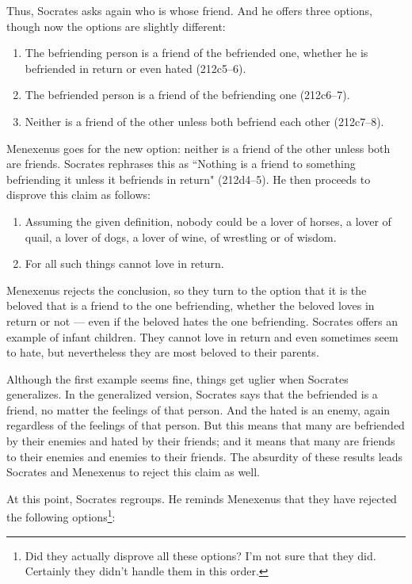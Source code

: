 \documentclass[11pt]{article}
\begin{document}
Thus, Socrates asks again who is whose friend. And he offers three options, though now the options are slightly different:

\begin{enumerate}
    \item The befriending person is a friend of the befriended one, whether he is befriended in return or even hated (212c5--6).
    \item The befriended person is a friend of the befriending one (212c6--7).
    \item Neither is a friend of the other unless both befriend each other (212c7--8).
\end{enumerate}

Menexenus goes for the new option: neither is a friend of the other unless both are friends.  Socrates rephrases this as ``Nothing is a friend to something befriending it unless it befriends in return" (212d4--5).  He then proceeds to disprove this claim as follows:

\begin{enumerate}
    \item Assuming the given definition, nobody could be a lover of horses, a lover of quail, a lover of dogs, a lover of wine, of wrestling or of wisdom.
    \item For all such things cannot love in return.
\end{enumerate}

Menexenus rejects the conclusion, so they turn to the option that it is the beloved that is a friend to the one befriending, whether the beloved loves in return or not --- even if the beloved hates the one befriending.  Socrates offers an example of infant children.  They cannot love in return and even sometimes seem to hate, but nevertheless they are most beloved to their parents.

Although the first example seems fine, things get uglier when Socrates generalizes.  In the generalized version, Socrates says that the befriended is a friend, no matter the feelings of that person. And the hated is an enemy, again regardless of the feelings of that person.  But this means that many are befriended by their enemies and hated by their friends; and it means that many are friends to their enemies and enemies to their friends.  The absurdity of these results leads Socrates and Menexenus to reject this claim as well.

At this point, Socrates regroups.  He reminds Menexenus that they have rejected the following options\footnote{Did they actually disprove all these options?  I'm not sure that they did.  Certainly they didn't handle them in this order.}:
\end{document}
